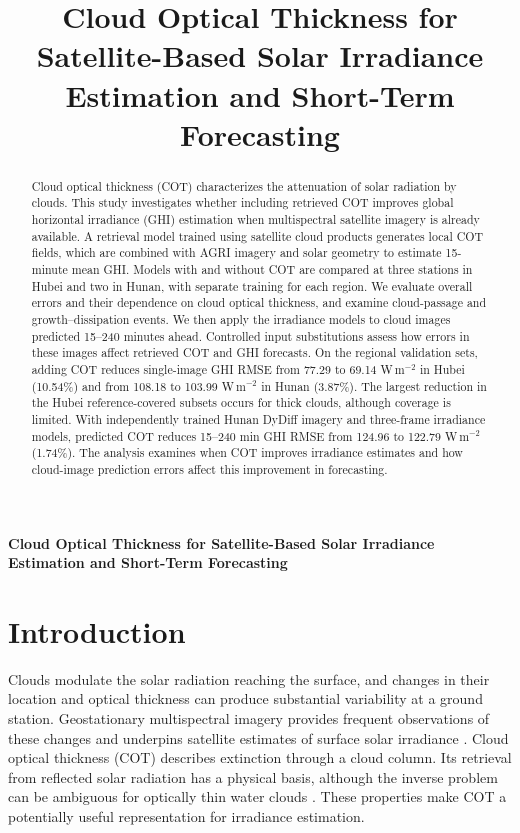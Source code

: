 \documentclass[11pt]{article}
\title{Cloud Optical Thickness for Satellite-Based Solar Irradiance Estimation and Short-Term Forecasting}
\author{}\date{}
\begin{document}
\begin{center}\LARGE\bfseries
Cloud Optical Thickness for Satellite-Based Solar Irradiance Estimation and Short-Term Forecasting
\end{center}
\begin{abstract}
Cloud optical thickness (COT) characterizes the attenuation of solar radiation by clouds. This study investigates whether including retrieved COT improves global horizontal irradiance (GHI) estimation when multispectral satellite imagery is already available. A retrieval model trained using satellite cloud products generates local COT fields, which are combined with AGRI imagery and solar geometry to estimate 15-minute mean GHI. Models with and without COT are compared at three stations in Hubei and two in Hunan, with separate training for each region. We evaluate overall errors and their dependence on cloud optical thickness, and examine cloud-passage and growth--dissipation events. We then apply the irradiance models to cloud images predicted 15--240 minutes ahead. Controlled input substitutions assess how errors in these images affect retrieved COT and GHI forecasts. On the regional validation sets, adding COT reduces single-image GHI RMSE from 77.29 to 69.14 W\,m$^{-2}$ in Hubei (10.54\%) and from 108.18 to 103.99 W\,m$^{-2}$ in Hunan (3.87\%). The largest reduction in the Hubei reference-covered subsets occurs for thick clouds, although coverage is limited. With independently trained Hunan DyDiff imagery and three-frame irradiance models, predicted COT reduces 15--240 min GHI RMSE from 124.96 to 122.79 W\,m$^{-2}$ (1.74\%). The analysis examines when COT improves irradiance estimates and how cloud-image prediction errors affect this improvement in forecasting.
\end{abstract}

\section{Introduction}
Clouds modulate the solar radiation reaching the surface, and changes in their location and optical thickness can produce substantial variability at a ground station. Geostationary multispectral imagery provides frequent observations of these changes and underpins satellite estimates of surface solar irradiance \cite{huang2019}. Cloud optical thickness (COT) describes extinction through a cloud column. Its retrieval from reflected solar radiation has a physical basis, although the inverse problem can be ambiguous for optically thin water clouds \cite{nakajima1990}. These properties make COT a potentially useful representation for irradiance estimation.
\end{document}
